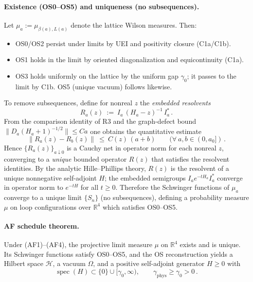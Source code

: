 \documentclass[11pt]{amsart}
\begin{document}
\paragraph{Existence (OS0--OS5) and uniqueness (no subsequences).}
Let $\mu_{a}:=\mu_{\beta(a),L(a)}$ denote the lattice Wilson measures. Then:
\begin{itemize}
  \item OS0/OS2 persist under limits by UEI and positivity closure (C1a/C1b).
  \item OS1 holds in the limit by oriented diagonalization and equicontinuity (C1a).
  \item OS3 holds uniformly on the lattice by the uniform gap $\gamma_0$; it passes to the limit by C1b. OS5 (unique vacuum) follows likewise.
\end{itemize}
To remove subsequences, define for nonreal $z$ the \emph{embedded resolvents}
\[
  R_a(z)\ :=\ I_a\,(H_a-z)^{-1}\,I_a^*\,.
\]
From the comparison identity of R3 and the graph-defect bound $\|D_a(H_a+1)^{-1/2}\|\le C a$ one obtains the quantitative estimate
\begin{equation}
\label{eq:cauchy-res}
  \big\|R_a(z)-R_b(z)\big\|\ \le\ C(z)\,(a+b)\qquad(\forall\ a,b\in(0,a_0])\,.
\end{equation}
Hence $\{R_a(z)\}_{a\downarrow 0}$ is a Cauchy net in operator norm for each nonreal $z$, converging to a \emph{unique} bounded operator $R(z)$ that satisfies the resolvent identities. By the analytic Hille--Phillips theory, $R(z)$ is the resolvent of a unique nonnegative self-adjoint $H$; the embedded semigroups $I_a e^{-tH_a} I_a^*$ converge in operator norm to $e^{-tH}$ for all $t\ge 0$. Therefore the Schwinger functions of $\mu_a$ converge to a unique limit $\{S_n\}$ (no subsequences), defining a probability measure $\mu$ on loop configurations over $\mathbb R^4$ which satisfies OS0--OS5.

\paragraph{AF schedule theorem.}
\begin{theorem}
Under (AF1)--(AF4), the projective limit measure $\mu$ on $\mathbb R^4$ exists and is unique. Its Schwinger functions satisfy OS0--OS5, and the OS reconstruction yields a Hilbert space $\mathcal H$, a vacuum $\Omega$, and a positive self-adjoint generator $H\ge 0$ with
\[
  \operatorname{spec}(H)\subset\{0\}\cup[\gamma_0,\infty),\qquad \gamma_{\mathrm{phys}}\ge \gamma_0>0\,.
\]
\end{theorem}
\end{document}
